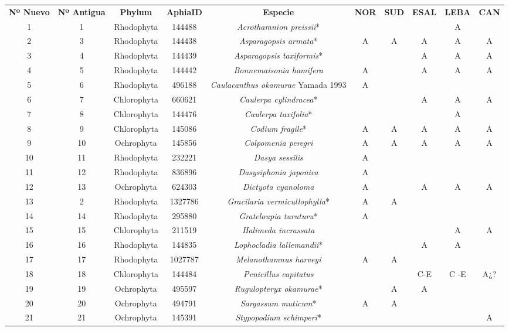 \documentclass{article}
\begin{document}
\begin{landscape}
\begin{center}
\begin{longtable}{|c|c|c|c|c|c|c|c|c|c|}
\hline
\rowcolor{green!70!yellow!40}
\textbf{Nº Nuevo}&\textbf{Nº Antigua}&\textbf{Phylum}&\textbf{AphiaID}&\textbf{Especie}&\textbf{NOR}&\textbf{SUD}&\textbf{ESAL}&\textbf{LEBA}&\textbf{CAN}\\
1&1&Rhodophyta&144488&\textit{Acrothamnion preissii}*&&&&A&\\
2&3&Rhodophyta&144438&\textit{Asparagopsis armata}*&A&A&A&A&A\\
3&4&Rhodophyta&144439&\textit{Asparagopsis taxiformis}*&&&A&A&A\\
4&5&Rhodophyta&144442&\textit{Bonnemaisonia hamifera}&A&&A&A&A\\
5&6&Rhodophyta&496188&\textit{Caulacanthus okamurae} Yamada 1993&A&&&&\\
6&7&Chlorophyta&660621&\textit{Caulerpa cylindracea}*&&&A&A&A\\
7&8&Chlorophyta&144476&\textit{Caulerpa taxifolia}*&&&&A&\\
8&9&Chlorophyta&145086&\textit{Codium fragile}*&A&A&A&A&A\\
9&10&Ochrophyta&145856&\textit{Colpomenia peregri}&A&A&A&A&A\\
10&11&Rhodophyta&232221&\textit{Dasya sessilis}&A&&&&\\
11&12&Rhodophyta&836896&\textit{Dasysiphonia japonica}&A&&&&\\
12&13&Ochrophyta&624303&\textit{Dictyota cyanoloma}&A&&A&A&A\\
13&2&Rhodophyta&1327786&\textit{Gracilaria vermicullophylla}*&A&A&&&\\
14&14&Rhodophyta&295880&\textit{Grateloupia turuturu}*&A&&&&\\
15&15&Chlorophyta&211519&\textit{Halimeda incrassata}&&&&A&A\\
16&16&Rhodophyta&144835&\textit{Lophocladia lallemandii}*&&&A&A&\\
17&17&Rhodophyta&1027787&\textit{Melanothamnus harveyi}&A&A&&&\\
18&18&Chlorophyta&144484&\textit{Penicillus capitatus}&&&C-E&C -E&A¿?\\
19&19&Ochrophyta&495597&\textit{Rugulopteryx okamurae}*&&A&A&&\\
20&20&Ochrophyta&494791&\textit{Sargassum muticum}*&A&A&&&\\
21&21&Ochrophyta&145391&\textit{Stypopodium schimperi}*&&&&&A\\

\end{longtable}
\end{center}
\end{landscape}
\end{document}
